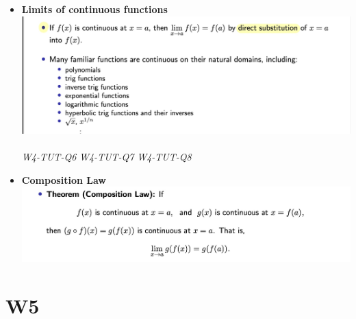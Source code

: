 \documentclass[10pt]{article}
\begin{document}
\begin{enumerate}
\begin{itemize}
\item \textbf{Limits of continuous functions}\\
\includegraphics[width=1\textwidth]{images/W4-6.jpg}\\\\
\textit{W4-TUT-Q6}
\textit{W4-TUT-Q7}
\textit{W4-TUT-Q8}

\item \textbf{Composition Law}\\
\includegraphics[width=1\textwidth]{images/W4-7.jpg}\\

\end{itemize}



\end{enumerate}


\newpage



\section{W5}
\end{document}
